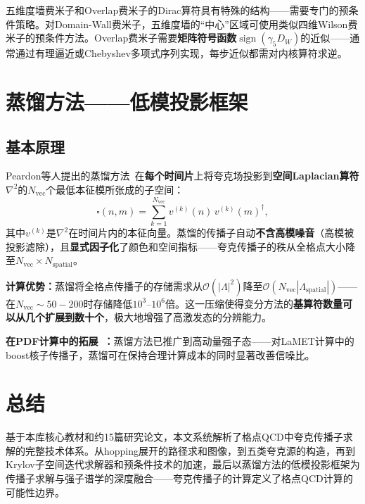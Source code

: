 \documentclass[12pt,a4paper]{ctexart}
\theoremstyle{definition}
\begin{document}
五维度墙费米子和Overlap费米子的Dirac算符具有特殊的结构——需要专门的预条件策略。对Domain-Wall费米子，五维度墙的``中心''区域可使用类似四维Wilson费米子的预条件方法。Overlap费米子需要\textbf{矩阵符号函数}$\operatorname{sign}(\gamma_5 D_W)$的近似——通常通过有理逼近或Chebyshev多项式序列实现，每步近似都需对内核算符求逆。

\section{蒸馏方法——低模投影框架}

\subsection{基本原理}

Peardon等人提出的蒸馏方法~\cite{Distillation2009}在\textbf{每个时间片}上将夸克场投影到\textbf{空间Laplacian算符}$\nabla^2$的$N_{\text{vec}}$个最低本征模所张成的子空间：
\begin{equation}
\square(n,m) = \sum_{k=1}^{N_{\text{vec}}} v^{(k)}(n) \, v^{(k)}(m)^\dagger,
\label{eq:distillation_projector}
\end{equation}
其中$v^{(k)}$是$\nabla^2$在时间片内的本征向量。蒸馏的传播子自动\textbf{不含高模噪音}（高模被投影滤除），且\textbf{显式因子化}了颜色和空间指标——夸克传播子的秩从全格点大小降至$N_{\text{vec}} \times N_{\text{spatial}}$。

\textbf{计算优势：}蒸馏将全格点传播子的存储需求从$\mathcal{O}(|\Lambda|^2)$降至$\mathcal{O}(N_{\text{vec}} |\Lambda_{\text{spatial}}|)$——在$N_{\text{vec}} \sim 50-200$时存储降低$10^3\text{--}10^6$倍。这一压缩使得变分方法的\textbf{基算符数量可以从几个扩展到数十个}，极大地增强了高激发态的分辨能力。

\textbf{在PDF计算中的拓展~\cite{Distillation2018HM}：}蒸馏方法已推广到高动量强子态——对LaMET计算中的boost核子传播子，蒸馏可在保持合理计算成本的同时显著改善信噪比。

\section{总结}

基于本库核心教材和约15篇研究论文，本文系统解析了格点QCD中夸克传播子求解的完整技术体系。从hopping展开的路径求和图像，到五类夸克源的构造，再到Krylov子空间迭代求解器和预条件技术的加速，最后以蒸馏方法的低模投影框架为传播子求解与强子谱学的深度融合——夸克传播子的计算定义了格点QCD计算的可能性边界。
\end{document}
